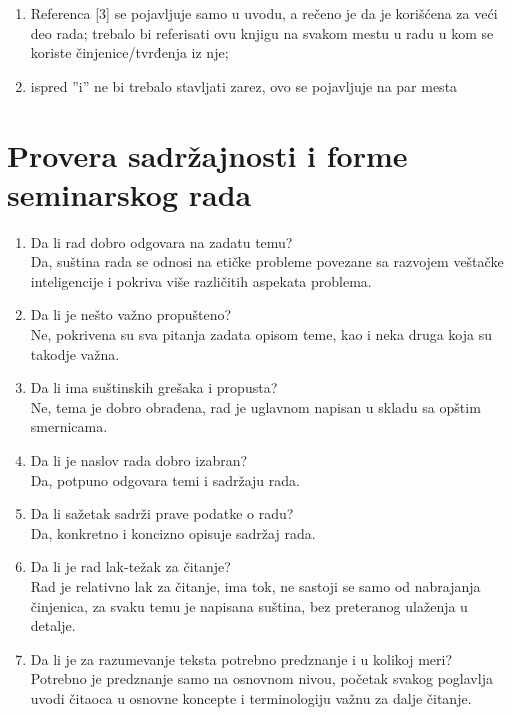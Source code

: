 \documentclass[a4paper]{report}
\begin{document}
\begin{enumerate}
\item Referenca [3] se pojavljuje samo u uvodu, a rečeno je da je korišćena za veći deo rada; trebalo bi referisati ovu knjigu na svakom mestu u radu u kom se koriste činjenice/tvrđenja iz nje; 

\item ispred ''i'' ne bi trebalo stavljati zarez, ovo se pojavljuje na par mesta
\end{enumerate}


\section{Provera sadržajnosti i forme seminarskog rada}

\begin{enumerate}
\item Da li rad dobro odgovara na zadatu temu?\\
Da, suština rada se odnosi na etičke probleme povezane sa razvojem veštačke inteligencije i pokriva više različitih aspekata problema.

\item Da li je nešto važno propušteno?\\
Ne, pokrivena su sva pitanja zadata opisom teme, kao i neka druga koja su takodje važna.

\item Da li ima suštinskih grešaka i propusta?\\
Ne, tema je dobro obrađena, rad je uglavnom napisan u skladu sa opštim smernicama.

\item Da li je naslov rada dobro izabran?\\
Da, potpuno odgovara temi i sadržaju rada.

\item Da li sažetak sadrži prave podatke o radu?\\
Da, konkretno i koncizno opisuje sadržaj rada.

\item Da li je rad lak-težak za čitanje?\\
Rad je relativno lak za čitanje, ima tok, ne sastoji se samo od nabrajanja činjenica, za svaku temu je napisana suština, bez preteranog ulaženja u detalje.

\item Da li je za razumevanje teksta potrebno predznanje i u kolikoj meri?\\
Potrebno je predznanje samo na osnovnom nivou, početak svakog poglavlja uvodi čitaoca u osnovne koncepte i terminologiju važnu za dalje čitanje.


\end{enumerate}
\end{document}
